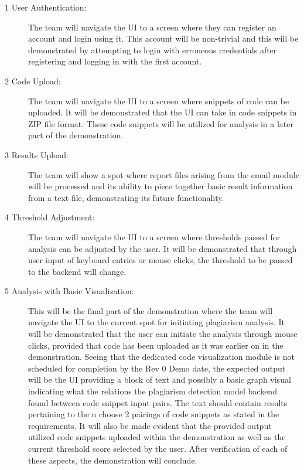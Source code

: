 \documentclass{article}
\begin{document}
\begin{description}
    \item[1 User Authentication:] The team will navigate the UI to a screen where they can 
    register an account and login using it. This account will be non-trivial and this will 
    be demonstrated by attempting to login with erroneous credentials after registering and 
    logging in with the first account.

    \item[2 Code Upload:] The team will navigate the UI to a screen where snippets of code 
    can be uploaded. It will be demonstrated that the UI can take in code snippets in ZIP file 
    format. These code snippets will be utilized for analysis in a later part of the demonstration.

    \item[3 Results Upload:] The team will show a spot where report files arising from the email 
    module will be processed and its ability to piece together basic result information from a text file,
    demonstrating its future functionality.

    \item[4 Threshold Adjustment:] The team will navigate the UI to a screen where thresholds passed
    for analysis can be adjusted by the user. It will be demonstrated that through user input 
    of keyboard entries or mouse clicks, the threshold to be passed to the backend will change.

    \item[5 Analysis with Basic Visualization:] This will be the final part of the demonstration where 
    the team will navigate the UI to the current spot for initiating plagiarism analysis. It will be 
    demonstrated that the user can initiate the analysis through mouse clicks, provided that code has 
    been uploaded as it was earlier on in the demonstration. Seeing that the dedicated code visualization 
    module is not scheduled for completion by the Rev 0 Demo date, the expected output will be the UI providing 
    a block of text and possibly a basic graph visual indicating what the relations the plagiarism detection model
    backend found between code snippet input pairs. The text should contain results pertaining to the n choose 2 
    pairings of code snippets as stated in the requirements. It will also be made evident that the provided output 
    utilized code snippets uploaded within the demonstration as well as the current threshold score selected by the user. 
    After verification of each of these aspects, the demonstration will conclude.

\end{description}
\end{document}
